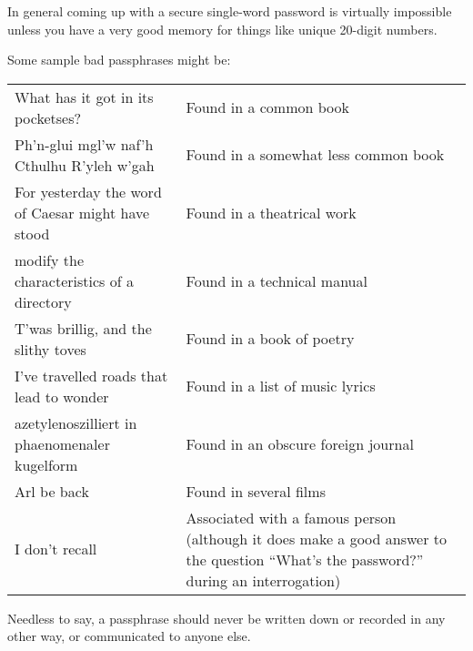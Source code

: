 In general coming up with a secure single-word password is virtually impossible
unless you have a very good memory for things like unique 20-digit numbers.

Some sample bad passphrases might be:

\begin{center}
\begin{tabular}{p{180.2pt} p{157pt}}
    What has it got in its     
     pocketses?                & Found in a common book\\
    Ph'n-glui mgl'w naf'h      
      Cthulhu R'yleh w'gah     & Found in a somewhat less common book\\
    For yesterday the word of  
      Caesar might have stood  & Found in a theatrical work\\
    modify the characteristics 
      of a directory           & Found in a technical manual\\
    T'was brillig, and the     
      slithy toves             & Found in a book of poetry\\
    I've travelled roads that  
      lead to wonder           & Found in a list of music lyrics\\
    azetylenoszilliert in      
      phaenomenaler kugel\-form  & Found in an obscure foreign journal\\
    Arl be back                & Found in several films\\
    I don't recall             & Associated with a famous person (although
                                 it does make a good answer to the question
                                 ``What's the password?'' during an
                                 interrogation)\\
\end{tabular}
\end{center}

Needless to say, a passphrase should never be written down or recorded in any
other way, or communicated to anyone else.


